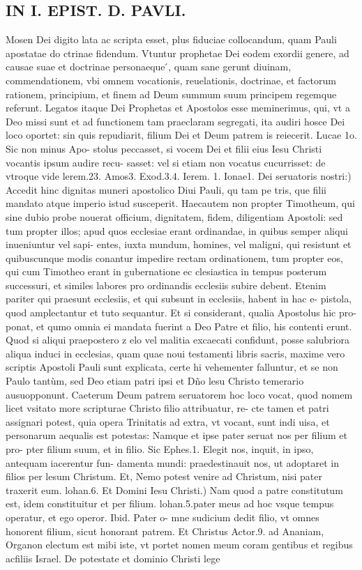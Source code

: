 \documentclass{article}
\begin{document}
\begin{pages}
\section*{IN I. EPIST. D. PAVLI. }
\marginpar{[ p.4 ]}\pstart Mosen Dei digito lata ac scripta esset, plus fiduciae collocandum, quam Pauli apostatae do ctrinae fidendum. Vtuntur prophetae Dei eodem exordii genere, ad causae suae et doctrinae personaeque ́, quam sane gerunt diuinam, commendationem, vbi omnem vocationis, reuelationis, doctrinae, et factorum rationem, principium, et finem ad Deum summum suum principem regemque  referunt. Legatos itaque  Dei Prophetas et Apostolos esse meminerimus, qui, vt a Deo missi sunt et ad functionem tam praeclaram segregati, ita audiri hosce Dei loco oportet: sin quis repudiarit, filium Dei et Deum patrem is reiecerit. Lucae 1o. Sic non minus Apo- stolus peccasset, si vocem Dei et filii eius Iesu Christi vocantis ipsum audire recu- sasset: vel si etiam non vocatus cucurrisset: de vtroque  vide lerem.23. Amos3. Exod.3.4. Ierem. 1. Ionae1.  \pend\pstart Dei seruatoris nostri:) Accedit hinc dignitas muneri apostolico Diui Pauli, qu tam pe tris, que  filii mandato atque  imperio istud susceperit. Haecautem non propter Timotheum, qui sine dubio probe nouerat officium, dignitatem, fidem, diligentiam Apostoli: sed tum propter illos; apud quos ecclesiae erant ordinandae, in quibus semper aliqui inueniuntur vel sapi- entes, iuxta mundum, homines, vel maligni, qui resistunt et quibuscunque  modis conantur impedire rectam ordinationem, tum propter eos, qui cum Timotheo erant in gubernatione ec clesiastica in tempus posterum successuri, et similes labores pro ordinandis ecclesiis subire debent. Etenim pariter qui praesunt ecclesiis, et qui subsunt in ecclesiis, habent in hac e- pistola, quod amplectantur et tuto sequantur. Et si considerant, qualia Apostolus hic pro- ponat, et qumo omnia ei mandata fuerint a Deo Patre et filio, his contenti erunt. Quod si aliqui praepostero z elo vel malitia excaecati confidunt, posse salubriora aliqua induci in ecclesias, quam quae noui testamenti libris sacris, maxime vero scriptis Apostoli Pauli sunt explicata, certe hi vehementer falluntur, et se non Paulo tantùm, sed Deo etiam patri ipsi et Dño lesu Christo temerario ausuopponunt. Caeterum Deum patrem seruatorem hoc loco vocat, quod nomem licet vsitato more scripturae Christo filio attribuatur, re- cte tamen et patri assignari potest, quia opera Trinitatis ad extra, vt vocant, sunt indi uisa, et personarum aequalis est potestas: Namque  et ipse pater seruat nos per filium et pro- pter filium suum, et in filio. Sic Ephes.1. Elegit nos, inquit, in ipso, antequam iacerentur fun- damenta mundi: praedestinauit nos, ut adoptaret in filios per lesum Christum. Et, Nemo potest venire ad Christum, nisi pater traxerit eum. lohan.6.  \pend\pstart Et Domini Iesu Christi.) Nam quod a patre constitutum est, idem constituitur et per filium. lohan.5.pater meus ad hoc vsque  tempus operatur, et ego operor. Ibid. Pater o- mne sudicium dedit filio, vt omnes honorent filium, sicut honorant patrem. Et Christus Actor.9. ad Ananiam, Organon electum est mibi iste, vt portet nomen meum coram gentibus et regibus acfiliis Israel. De potestate et dominio Christi lege 
\end{pages}
\end{document}
